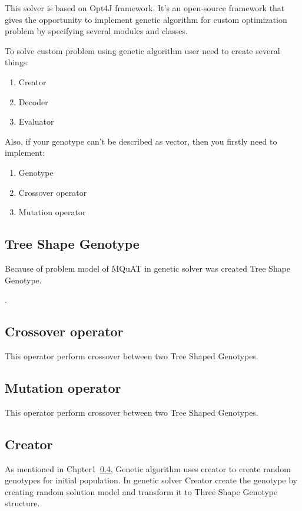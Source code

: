 This solver is based on Opt4J framework. It's an open-source framework that gives the opportunity to implement genetic algorithm for custom optimization problem by specifying several modules and classes.

To solve custom problem using genetic algorithm user need to create several things:
\begin{enumerate}
	\item Creator
	\item Decoder
	\item Evaluator
\end{enumerate}
Also, if your genotype can't be described as vector, then you firstly need to implement:
\begin{enumerate}
	\item Genotype
	\item Crossover operator
	\item Mutation operator
\end{enumerate}

\subsection{Tree Shape Genotype}
Because of problem model of MQuAT in genetic solver was created Tree Shape Genotype.

.
 
\subsection{Crossover operator}
This operator perform crossover between two Tree Shaped Genotypes. 




\subsection{Mutation operator}
This operator perform crossover between two Tree Shaped Genotypes. 


\subsection{Creator}
\label{subsec:Creator}
As mentioned in Chpter1~\ref{subsec:Creator}, Genetic algorithm uses creator to create random genotypes for initial population.
In genetic solver Creator create the genotype by creating random solution model and transform it to Three Shape Genotype structure.

